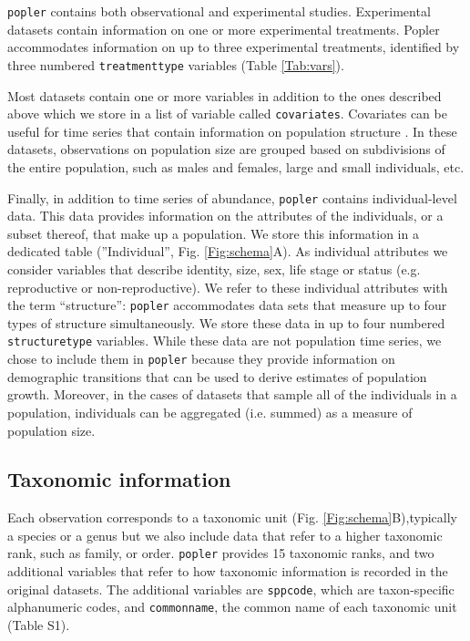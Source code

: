 \documentclass{article}\usepackage[]{graphicx}\usepackage[]{color}
\newcommand{\tom}[1]{{\textit{\color{red}{[#1]}}}}
\begin{document}
\texttt{popler} contains both observational and experimental studies. Experimental datasets contain information on one or more experimental treatments. Popler accommodates information on up to three experimental treatments, identified by three numbered \texttt{treatment\textunderscore type} variables (Table \ref{Tab:vars}). 

Most datasets contain one or more variables in addition to the ones described above which we store in a list of variable called \texttt{covariates}. Covariates can be useful for time series that contain information on population structure \tom{Did you decide whether / how this would be indicated in the metadata?}. In these datasets, observations on population size are grouped based on subdivisions of the entire population, such as males and females, large and small individuals, etc.

Finally, in addition to time series of abundance, \texttt{popler} contains individual-level data. This data provides information on the attributes of the individuals, or a subset thereof, that make up a population. We store this information in a dedicated table (''Individual'', Fig. \ref{Fig:schema}A). As individual attributes we consider variables that describe identity, size, sex, life stage or status (e.g. reproductive or non-reproductive). We refer to these individual attributes with the term ``structure'': \texttt{popler} accommodates data sets that measure up to four types of structure simultaneously. We store these data in up to four numbered \texttt{structure\textunderscore type} variables. While these data are not population time series, we chose to include them in \texttt{popler} because they provide information on demographic transitions that can be used to derive estimates of population growth. Moreover, in the cases of datasets that sample all of the individuals in a population, individuals can be aggregated (i.e. summed) as a measure of population size.

\subsection*{Taxonomic information}
Each observation corresponds to a taxonomic unit (Fig. \ref{Fig:schema}B),typically a species or a genus but we also include data that refer to a higher taxonomic rank, such as family, or order. %
\texttt{popler} provides 15 taxonomic ranks, and two additional variables that refer to how taxonomic information is recorded in the original datasets. The additional variables are \texttt{sppcode}, which are taxon-specific alphanumeric codes, and \texttt{common\textunderscore name}, the common name of each taxonomic unit (Table S1).
\end{document}
